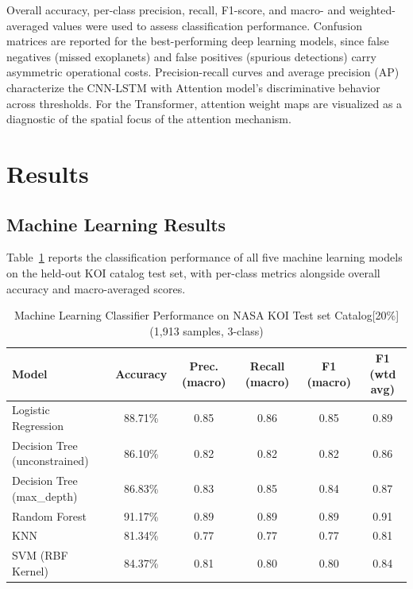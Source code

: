 \documentclass[preprint,11pt,times]{elsarticle}
\begin{document}
Overall accuracy, per-class precision, recall, F1-score, and macro- and weighted-averaged values were used to assess classification performance. Confusion matrices are reported for the best-performing deep learning models, since false negatives (missed exoplanets) and false positives (spurious detections) carry asymmetric operational costs. Precision-recall curves and average precision (AP) characterize the CNN-LSTM with Attention model's discriminative behavior across thresholds. For the Transformer, attention weight maps are visualized as a diagnostic of the spatial focus of the attention mechanism.

\section{Results}\label{sec6}

\subsection{Machine Learning Results}\label{subsec6a}

Table~\ref{tab3} reports the classification performance of all five machine learning models on the held-out KOI catalog test set, with per-class metrics alongside overall accuracy and macro-averaged scores.

\begin{table}[!ht]
\centering
\small
\caption{Machine Learning Classifier Performance on NASA KOI Test set Catalog[20\%] (1,913 samples, 3-class)}\label{tab3}
\begin{tabular}{p{3cm}ccccc}
\toprule
Model & Accuracy & Prec. (macro) & Recall (macro) & F1 (macro) & F1 (wtd avg)\\
\midrule
Logistic Regression & 88.71\% & 0.85 & 0.86 & 0.85 & 0.89  \\
Decision Tree (unconstrained) & 86.10\% & 0.82 & 0.82 & 0.82 & 0.86  \\
Decision Tree (max\_depth) & 86.83\% & 0.83 & 0.85 & 0.84 & 0.87  \\
Random Forest & 91.17\% & 0.89 & 0.89 & 0.89 & 0.91 \\
KNN & 81.34\% & 0.77 & 0.77 & 0.77 & 0.81  \\
SVM (RBF Kernel) & 84.37\% & 0.81 & 0.80 & 0.80 & 0.84  \\
\bottomrule
\end{tabular}
\end{table}
\end{document}
